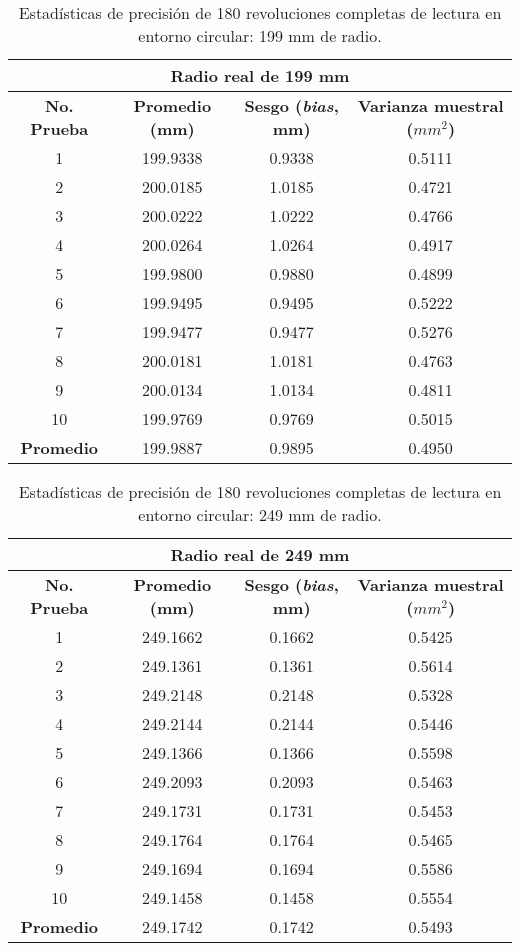\begin{table}[H]
	\centering
	\begin{tabular}{|c|c|c|c|}
		\hline
		\multicolumn{4}{|c|}{\textbf{Radio real de 199 mm}} \\ \hline
		\textbf{No. Prueba} & \textbf{Promedio (mm)} & \textbf{Sesgo (\textit{bias}, mm)} & \textbf{Varianza muestral ($mm^2$)} \\ \hline
		1 & 199.9338 & 0.9338 & 0.5111 \\ 
		2 & 200.0185 & 1.0185 & 0.4721 \\ 
		3 & 200.0222 & 1.0222 & 0.4766 \\ 
		4 & 200.0264 & 1.0264 & 0.4917 \\ 
		5 & 199.9800 & 0.9880 & 0.4899 \\ 
		6 & 199.9495 & 0.9495 & 0.5222 \\ 
		7 & 199.9477 & 0.9477 & 0.5276 \\ 
		8 & 200.0181 & 1.0181 & 0.4763 \\ 
		9 & 200.0134 & 1.0134 & 0.4811 \\ 
		10 & 199.9769 & 0.9769 & 0.5015 \\ \hline
		\textbf{Promedio} & 199.9887 & 0.9895 & 0.4950 \\ \hline
	\end{tabular}
	\caption{Estadísticas de precisión de 180 revoluciones completas de lectura en entorno circular: 199 mm de radio.}
	\label{fig:tabla_dists2}
\end{table}

\begin{table}[H]
	\centering
	\begin{tabular}{|c|c|c|c|}
		\hline
		\multicolumn{4}{|c|}{\textbf{Radio real de 249 mm}} \\ \hline
		\textbf{No. Prueba} & \textbf{Promedio (mm)} & \textbf{Sesgo (\textit{bias}, mm)} & \textbf{Varianza muestral ($mm^2$)} \\ \hline
		1 & 249.1662 & 0.1662 & 0.5425 \\ 
		2 & 249.1361 & 0.1361 & 0.5614 \\ 
		3 & 249.2148 & 0.2148 & 0.5328 \\ 
		4 & 249.2144 & 0.2144 & 0.5446 \\ 
		5 & 249.1366 & 0.1366 & 0.5598 \\ 
		6 & 249.2093 & 0.2093 & 0.5463 \\ 
		7 & 249.1731 & 0.1731 & 0.5453 \\ 
		8 & 249.1764 & 0.1764 & 0.5465 \\ 
		9 & 249.1694 & 0.1694 & 0.5586 \\ 
		10 & 249.1458 & 0.1458 & 0.5554 \\ \hline
		\textbf{Promedio} & 249.1742 & 0.1742 & 0.5493 \\ \hline
	\end{tabular}
	\caption{Estadísticas de precisión de 180 revoluciones completas de lectura en entorno circular: 249 mm de radio.}
	\label{fig:tabla_dists3}
\end{table}

